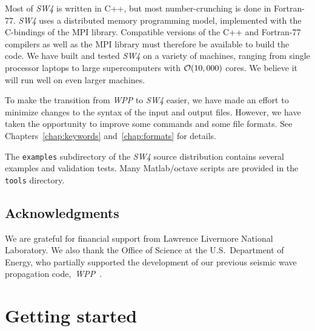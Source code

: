 \documentclass[11pt]{report}
\begin{document}

Most of \emph{SW4} is written in C++, but most number-crunching is done in Fortran-77. \emph{SW4}
uses a distributed memory programming model, implemented with the C-bindings of the MPI
library. Compatible versions of the C++ and Fortran-77 compilers as well as the MPI library must
therefore be available to build the code. We have built and tested \emph{SW4} on a variety of
machines, ranging from single processor laptops to large supercomputers with ${\cal O}(10,000)$
cores. We believe it will run well on even larger machines.

To make the transition from \emph{WPP} to \emph{SW4} easier, we have made an effort to minimize
changes to the syntax of the input and output files. However, we have taken the opportunity to
improve some commands and some file formats. See Chapters~\ref{chap:keywords} and~\ref{chap:formats}
for details.

The {\tt examples} subdirectory of the \emph{SW4} source distribution contains several examples and
validation tests. Many Matlab/octave scripts are provided in the {\tt tools} directory.

\section*{Acknowledgments} 
We are grateful for financial support from Lawrence Livermore National Laboratory. We also thank
the Office of Science at the U.S.~Department of Energy, who partially supported the development of our
previous seismic wave propagation code,~\emph{WPP}~\cite{WPP2}.

\chapter{Getting started}
\end{document}
